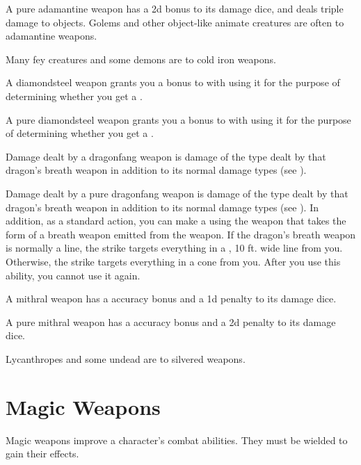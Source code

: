         A pure adamantine weapon has a \plus2d bonus to its damage dice, and deals triple damage to objects.
        Golems and other object-like animate creatures are often  to adamantine weapons.

         Many fey creatures and some demons are  to cold iron weapons.

         A diamondsteel weapon grants you a  bonus to  with  using it for the purpose of determining whether you get a .

         A pure diamondsteel weapon grants you a  bonus to  with  using it for the purpose of determining whether you get a .

         Damage dealt by a dragonfang weapon is damage of the type dealt by that dragon's breath weapon in addition to its normal damage types (see ).

         Damage dealt by a pure dragonfang weapon is damage of the type dealt by that dragon's breath weapon in addition to its normal damage types (see ).
        In addition, as a standard action, you can make a  using the weapon that takes the form of a breath weapon emitted from the weapon.
        If the dragon's breath weapon is normally a line, the strike targets everything in a \arealarge, 10 ft. wide line from you.
        Otherwise, the strike targets everything in a \areamed cone from you.
        After you use this ability, you  cannot use it again.

         A mithral weapon has a  accuracy bonus and a \minus1d penalty to its damage dice.

         A pure mithral weapon has a  accuracy bonus and a \minus2d penalty to its damage dice.

         Lycanthropes and some undead are  to silvered weapons.

\newpage
\section{Magic Weapons}
    Magic weapons improve a character's combat abilities.
    They must be wielded to gain their effects.

